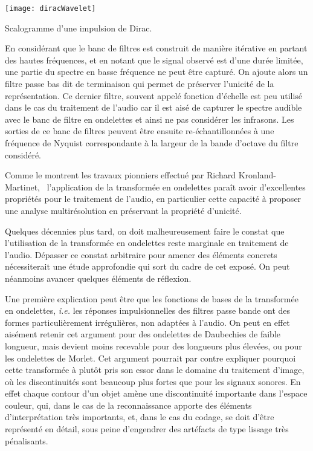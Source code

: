 \begin{marginfigure}
  \texttt{[image: diracWavelet]}
  \caption{Scalogramme d'une impulsion de Dirac.}
  \label{fig:dirac}
\end{marginfigure}

En considérant que le banc de filtres est construit de manière itérative en partant des hautes fréquences, et en notant que le signal observé est d'une durée limitée, une partie du spectre en basse fréquence ne peut être capturé. On ajoute alors un filtre passe bas dit \og de terminaison \fg qui permet de préserver l'unicité de la représentation. Ce dernier filtre, souvent appelé \og fonction d'échelle \fg est peu utilisé dans le cas du traitement de l'audio car il est aisé de capturer le spectre audible avec le banc de filtre en ondelettes et ainsi ne pas considérer les infrasons. Les sorties de ce banc de filtres peuvent être ensuite re-échantillonnées à une fréquence de Nyquist correspondante à la largeur de la bande d'octave du filtre considéré.


Comme le montrent les travaux pionniers effectué par Richard Kronland-Martinet,~\cite{kronland1987analysis} l'application de la transformée en ondelettes paraît avoir d'excellentes propriétés pour le traitement de l'audio, en particulier cette capacité à proposer une analyse multirésolution en préservant la propriété d'unicité.



Quelques décennies plus tard, on doit malheureusement faire le constat que l'utilisation de la transformée en ondelettes reste marginale en traitement de l'audio. Dépasser ce constat arbitraire pour amener des éléments concrets nécessiterait une étude approfondie qui sort du cadre de cet exposé. On peut néanmoins avancer quelques éléments de réflexion.

Une première explication peut être que les fonctions de bases de la transformée en ondelettes, \textit{i.e.} les réponses impulsionnelles des filtres passe bande ont des formes particulièrement irrégulières, non adaptées à l'audio. On peut en effet aisément retenir cet argument pour des ondelettes de Daubechies de faible longueur, mais devient moins recevable pour des longueurs plus élevées, ou pour les ondelettes de Morlet. Cet argument pourrait par contre expliquer pourquoi cette transformée à plutôt pris son essor dans le domaine du traitement d'image, où les discontinuités sont beaucoup plus fortes que pour les signaux sonores. En effet chaque contour d'un objet amène une discontinuité importante dans l'espace couleur, qui, dans le cas de la reconnaissance apporte des éléments d'interprétation très importants, et, dans le cas du codage, se doit d'être représenté en détail, sous peine d'engendrer des artéfacts de type \og lissage \fg très pénalisants.

